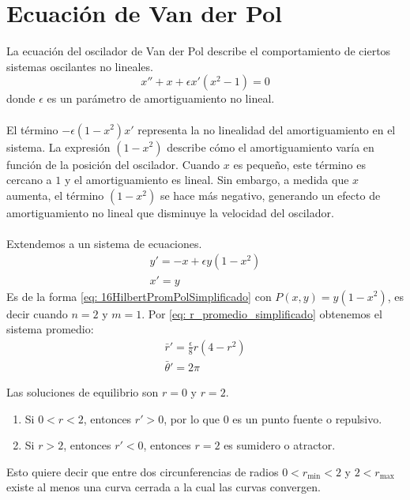 \section{Ecuación de Van der Pol}
La ecuación del oscilador de Van der Pol describe el comportamiento de ciertos sistemas oscilantes no lineales.
\begin{equation}\label{eq: VP}
	x''+x+\epsilon x'(x^2-1)=0
\end{equation}
donde $\epsilon$ es un parámetro de amortiguamiento no lineal.\\
\\El término $-\epsilon(1 - x^2)x'$ representa la no linealidad del amortiguamiento en el sistema. La expresión
$(1 - x^2)$ describe cómo el amortiguamiento varía en función de la posición del oscilador. Cuando $x$ es
pequeño, este término es cercano a $1$ y el amortiguamiento es lineal. Sin embargo, a medida que $x$
aumenta, el término $(1 - x^2)$ se hace más negativo, generando un efecto de amortiguamiento no lineal que
disminuye la velocidad del oscilador.\\
\\Extendemos a un sistema de ecuaciones.
\begin{equation}\label{eq: VPsis}
	\begin{matrix}
		y'=-x+\epsilon y(1-x^2) \\
		x'=y
	\end{matrix}
\end{equation}
Es de la forma \eqref{eq: 16HilbertPromPolSimplificado} con $P(x,y)=y(1-x^2)$, es decir cuando $n=2$ y $m=1$.
Por \eqref{eq: r_promedio_simplificado} obtenemos el sistema promedio:
\begin{equation}\label{eq: drvander}
	\begin{matrix}
		\bar{r}'=\frac{\epsilon}{8}r(4-r^2) \\
		\bar{\theta}'=2\pi
	\end{matrix}
\end{equation}

Las soluciones de equilibrio son $r=0$ y $r=2$.
\begin{enumerate}
	\item Si $0<r<2$, entonces $r'>0$, por lo que $0$ es un punto fuente o repulsivo.
	\item Si $r>2$, entonces $r'<0$, entonces $r=2$ es sumidero o atractor.
\end{enumerate}

Esto quiere decir que entre dos circunferencias de radios $0<r_{\min}<2$ y $2<r_{\max}$ existe al menos una curva cerrada a la cual las curvas convergen.

